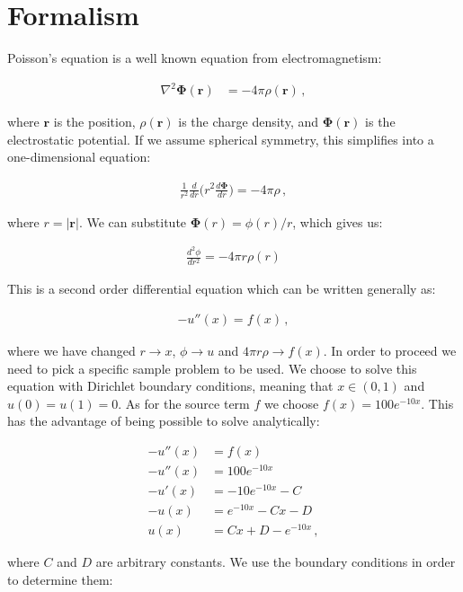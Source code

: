 \documentclass[english,notitlepage,reprint,nofootinbib]{revtex4-1}  %
\begin{document}
\section{Formalism} \label{sec:II}

Poisson's equation is a well known equation from electromagnetism:

\begin{align*}
\nabla^2 \boldsymbol\Phi (\boldsymbol r) &= -4\pi \rho (\boldsymbol r) \, ,
\end{align*}

where $\boldsymbol r$ is the position, $\rho(\boldsymbol r)$ is the charge density, and $\boldsymbol \Phi (\boldsymbol r)$ is the electrostatic potential. If we assume spherical symmetry, this simplifies into a one-dimensional equation:

\begin{align*}
\frac{1}{r^2} \frac{d}{dr} \bigg(r^2 \frac{d\boldsymbol \Phi}{dr} \bigg) = - 4\pi \rho \, ,
\end{align*}

where $r = |\boldsymbol r|$. We can substitute $\boldsymbol \Phi (r) = \phi(r)/r$, which gives us:

\begin{align*}
\frac{d^2 \phi}{dr^2} = - 4\pi r \rho (r)
\end{align*}

This is a second order differential equation which can be written generally as:

\begin{align*}
-u''(x) = f(x) \, ,
\end{align*}

where we have changed $r \to x$, $\phi \to u$ and $4\pi r \rho \to f(x)$. In order to proceed we need to pick a specific sample problem to be used. We choose to solve this equation with Dirichlet boundary conditions, meaning that $x \in (0,1)$ and $u(0)=u(1)=0$. As for the source term $f$ we choose $f(x) = 100 e^{-10 x}$. This has the advantage of being possible to solve analytically:

\begin{align*}
-u''(x) &= f(x) \\
-u''(x) &= 100 e^{-10x} \\
-u'(x) &= -10e^{-10x} - C \\
-u(x) &= e^{-10x} - Cx - D \\
u(x) &= Cx + D - e^{-10x} \, ,
\end{align*}

where $C$ and $D$ are arbitrary constants. We use the boundary conditions in order to determine them:
\end{document}
